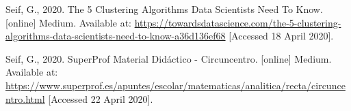 \documentclass[conference,a4paper]{IEEEtran}
\begin{document}


\clearpage
\begin{thebibliography}{9}
	
	\label{bib:georgeSeif}
	Seif, G., 2020. The 5 Clustering Algorithms Data Scientists Need To Know. [online] Medium. 
	Available at: \href{https://towardsdatascience.com/the-5-clustering-algorithms-data-scientists-need-to-know-a36d136ef68}{https://towardsdatascience.com/the-5-clustering-algorithms-data-scientists-need-to-know-a36d136ef68}
	[Accessed 18 April 2020].

	\label{bib:georgeSeif}
	Seif, G., 2020. SuperProf Material Didáctico - Circuncentro. [online] Medium. 
	Available at: \href{https://www.superprof.es/apuntes/escolar/matematicas/analitica/recta/circuncentro.html}{https://www.superprof.es/apuntes/escolar/matematicas/analitica/recta/circuncentro.html}
	[Accessed 22 April 2020].

\end{thebibliography}
\end{document}
